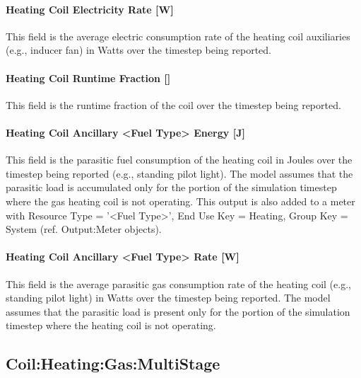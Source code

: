 \paragraph{Heating Coil Electricity Rate {[}W{]}}\label{heating-coil-electric-power-w-3}

This field is the average electric consumption rate of the heating coil auxiliaries (e.g., inducer fan) in Watts over the timestep being reported.

\paragraph{Heating Coil Runtime Fraction {[]}}\label{heating-coil-runtime-fraction-3}

This field is the runtime fraction of the coil over the timestep being reported.

\paragraph{Heating Coil Ancillary <Fuel Type> Energy {[}J{]}}\label{heating-coil-ancillary-gas-energy-j}

This field is the parasitic fuel consumption of the heating coil in Joules over the timestep being reported (e.g., standing pilot light). The model assumes that the parasitic load is accumulated only for the portion of the simulation timestep where the gas heating coil is not operating. This output is also added to a meter with Resource Type = '<Fuel Type>', End Use Key = Heating, Group Key = System (ref. Output:Meter objects).

\paragraph{Heating Coil Ancillary <Fuel Type> Rate {[}W{]}}\label{heating-coil-ancillary-gas-rate-w}

This field is the average parasitic gas consumption rate of the heating coil (e.g., standing pilot light) in Watts over the timestep being reported. The model assumes that the parasitic load is present only for the portion of the simulation timestep where the heating coil is not operating.

\subsection{Coil:Heating:Gas:MultiStage}\label{coilheatinggasmultistage}

